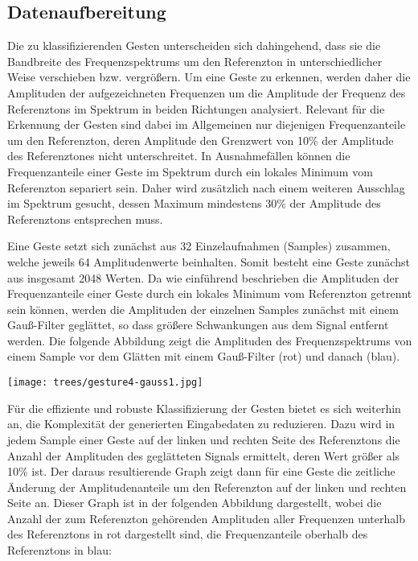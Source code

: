 \subsection{Datenaufbereitung}

Die zu klassifizierenden Gesten unterscheiden sich dahingehend, dass sie die Bandbreite 
des Frequenzspektrums um den Referenzton in unterschiedlicher Weise verschieben bzw. vergrößern. 
Um eine Geste zu erkennen, werden daher die Amplituden der aufgezeichneten Frequenzen 
um die Amplitude der Frequenz des Referenztons im Spektrum in beiden Richtungen analysiert. 
Relevant für die Erkennung der Gesten sind dabei im Allgemeinen nur diejenigen Frequenzanteile 
um den Referenzton, deren Amplitude den Grenzwert von 10\% der Amplitude des Referenztones nicht unterschreitet. 
In Ausnahmefällen können die Frequenzanteile einer Geste im Spektrum durch ein lokales Minimum vom Referenzton 
separiert sein. Daher wird zusätzlich nach einem weiteren Ausschlag im Spektrum gesucht, 
dessen Maximum mindestens 30\% der Amplitude des Referenztons entsprechen muss.


Eine Geste setzt sich zunächst aus 32 Einzelaufnahmen (Samples) zusammen, welche jeweils 
64 Amplitudenwerte beinhalten. Somit besteht eine Geste zunächst aus insgesamt 2048 Werten.
Da wie einführend beschrieben die Amplituden der Frequenzanteile einer Geste durch ein lokales Minimum vom Referenzton 
getrennt sein können, werden die Amplituden der einzelnen Samples zunächst mit einem Gauß-Filter geglättet, 
so dass größere Schwankungen aus dem Signal entfernt werden. 
Die folgende Abbildung zeigt die Amplituden des Frequenzspektrums von einem Sample 
vor dem Glätten mit einem Gauß-Filter (rot) und danach (blau).

\begin{center}
  \texttt{[image: trees/gesture4-gauss1.jpg]}
\end{center}

Für die effiziente und robuste Klassifizierung der Gesten bietet es sich weiterhin an, 
die Komplexität der generierten Eingabedaten zu reduzieren. Dazu wird in jedem Sample einer Geste 
auf der linken und rechten Seite des Referenztons die Anzahl der Amplituden des geglätteten Signals ermittelt, 
deren Wert größer als 10\% ist. Der daraus resultierende Graph zeigt dann für eine Geste die zeitliche 
Änderung der Amplitudenanteile um den Referenzton auf der linken und rechten Seite an. Dieser Graph ist in der folgenden 
Abbildung dargestellt, wobei die Anzahl der zum Referenzton gehörenden Amplituden aller Frequenzen unterhalb des
Referenztons in rot dargestellt sind, die Frequenzanteile oberhalb des Referenztons in blau:

